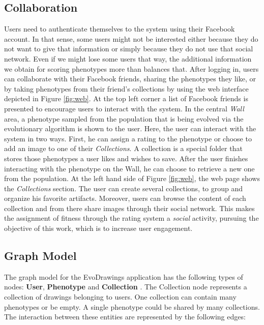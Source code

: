 \subsection{Collaboration}
\label{sec:col}
Users need to authenticate themselves to the system using their
Facebook account. In that sense, some users might not be interested
either because they do not want to give that information or simply because
they do not use that social network. Even if we might lose
some users that way, the additional information we obtain for scoring
phenotypes more than balances that. 
After logging in,
users can collaborate with their Facebook friends, 
sharing the phenotypes they like, or by taking phenotypes
from their friend's collections by using the web interface depicted 
in Figure \ref{fig:web}.
At the top left corner a list of Facebook friends is presented
to encourage users to interact with the system. In the central 
\emph{ Wall } area, a phenotype sampled from the population that is
being evolved via the evolutionary algorithm 
is shown to the user.
Here, the user can interact with the system in two ways.
First, he can assign a rating to the phenotype or choose to add an image to one of their \emph{Collections}.
A collection is a special folder that stores those phenotypes a user likes and wishes
to save. After the user finishes interacting with the phenotype
on the Wall, he can choose to retrieve a new one from the population.
At the left hand side of Figure \ref{fig:web}, the web page shows the \emph{Collections} section.
The user can create several collections, to group and organize his favorite 
artifacts. Moreover, users can browse the content of each collection and from
there share images through their social network. This makes the assignment 
of fitness through the rating system a {\em social} activity, 
pursuing the objective of this work, which is to increase user engagement.

\subsection{Graph Model} 
The graph model for the EvoDrawings application has the following types of
nodes: {\bf User}, {\bf Phenotype} and {\bf Collection} . The Collection node represents
a collection of drawings belonging to users. One collection can contain many phenotypes 
or be empty. A single phenotype could be shared by many collections. The interaction 
between these entities are represented by the following edges:

